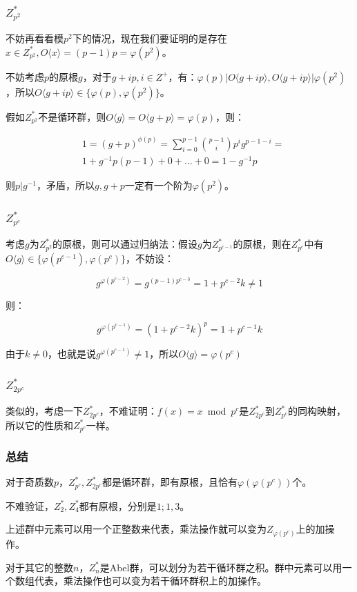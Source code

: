 \documentclass[10pt]{beamer}
\begin{document}
	\begin{frame}
		\frametitle{$Z^*_{p^2}$}
	
		不妨再看看模$p^2$下的情况，现在我们要证明的是存在$x\in Z^*_{p^2},O\langle x\rangle=(p-1)p=\varphi(p^2)$。

		不妨考虑$p$的原根$g$，对于$g+ip,i\in Z^+$，有：$\varphi(p)|O\langle g+ip\rangle,O\langle g+ip\rangle|\varphi(p^2)$，所以$O\langle g+ip\rangle\in\{\varphi(p),\varphi(p^2)\}$。

		假如$Z_{p^2}^*$不是循环群，则$O\langle g\rangle=O\langle g+p\rangle=\varphi(p)$，则：

		$$
		\begin{aligned}
			&1=(g+p)^{\phi(p)}=\sum_{i=0}^{p-1}{p-1\choose i}p^{i}g^{p-1-i}=\\
			&1+g^{-1}p(p-1)+0+\dots+0=1-g^{-1}p
		\end{aligned}
		$$

		则$p|g^{-1}$，矛盾，所以$g,g+p$一定有一个阶为$\varphi(p^2)$。
	
	\end{frame}
	\begin{frame}
		\frametitle{$Z^*_{p^c}$}
	
		考虑$g$为$Z^*_{p^2}$的原根，则可以通过归纳法：假设$g$为$Z^*_{p^{c-1}}$的原根，则在$Z^*_{p^c}$中有$O\langle g\rangle\in\{\varphi(p^{c-1}),\varphi(p^c)\}$，不妨设：

		$$
		g^{\varphi(p^{c-2})}=g^{(p-1)p^{c-3}}=1+p^{c-2}k\not=1
		$$

		则：

		$$
		g^{\varphi(p^{c-1})}=(1+p^{c-2}k)^p=1+p^{c-1}k
		$$

		由于$k\not=0$，也就是说$g^{\varphi(p^{c-1})}\not=1$，所以$O\langle g\rangle=\varphi(p^c)$
	
	\end{frame}
	\begin{frame}
		\frametitle{$Z^*_{2p^c}$}
	
		类似的，考虑一下$Z^*_{2p^c}$，不难证明：$f(x)=x\bmod p^c$是$Z^*_{2p^c}$到$Z^*_{p^c}$的同构映射，所以它的性质和$Z^*_{p^c}$一样。
	
	\end{frame}
	\begin{frame}
		\frametitle{总结}
	
		对于奇质数$p$，$Z^*_{p^c},Z^*_{2p^c}$都是循环群，即有原根，且恰有$\varphi(\varphi(p^c))$个。

		不难验证，$Z^*_2,Z^*_4$都有原根，分别是$1;1,3$。

		上述群中元素可以用一个正整数来代表，乘法操作就可以变为$Z_{\varphi(p^c)}$上的加操作。

		对于其它的整数$n$，$Z^*_n$是Abel群，可以划分为若干循环群之积。群中元素可以用一个数组代表，乘法操作也可以变为若干循环群积上的加操作。
	
	\end{frame}
\end{document}
